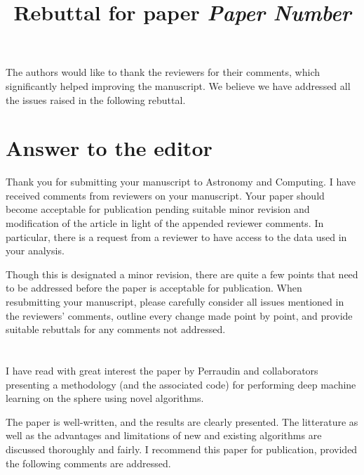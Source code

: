 \documentclass[12pt,a4paper]{article}
\title{\vspace{-1cm}
\begin{flushleft} {\sffamily Rebuttal for paper \emph{Paper Number} }\end{flushleft}}
\date{\vspace{-1.7cm}\begin{flushleft}\sffamily DeepSphere: Efficient spherical Convolutional Neural Network with HEALPix sampling for cosmological applications, Nathanaël Perraudin, Michaël Defferrard, Tomasz Kacprzak, Raphael Sgier \end{flushleft}}
\newcommand{\todo}[1]{{\color[rgb]{.6,.1,.6}{TODO: #1}}}
\begin{document}
\maketitle


The authors would like to thank the reviewers for their comments, which significantly helped improving the manuscript. We believe we have addressed all the issues raised in the following rebuttal. 

\section*{Answer to the editor}


\begin{mdframed}[style=comment] 
Thank you for submitting your manuscript to Astronomy and Computing. I have received comments from reviewers on your manuscript. Your paper should become acceptable for publication pending suitable minor revision and modification of the article in light of the appended reviewer comments.  In particular, there is a request from a reviewer to have access to the data used in your analysis.  

Though this is designated a minor revision, there are quite a few points that need to be addressed before the paper is acceptable for publication.  When resubmitting your manuscript, please carefully consider all issues mentioned in the reviewers' comments, outline every change made point by point, and provide suitable rebuttals for any comments not addressed.
\end{mdframed}

\todo{Answer to editor}

\section{}

\subsection{}

\begin{mdframed}[style=comment] 
I have read with great interest the paper by Perraudin and collaborators presenting a methodology (and the associated code) for performing deep machine learning on the sphere using novel algorithms. 

The paper is well-written, and the results are clearly presented. The litterature as well as the advantages and limitations of new and existing algorithms are discussed thoroughly and fairly. I recommend this paper for publication, provided the following comments are addressed.
\end{mdframed}
\end{document}
